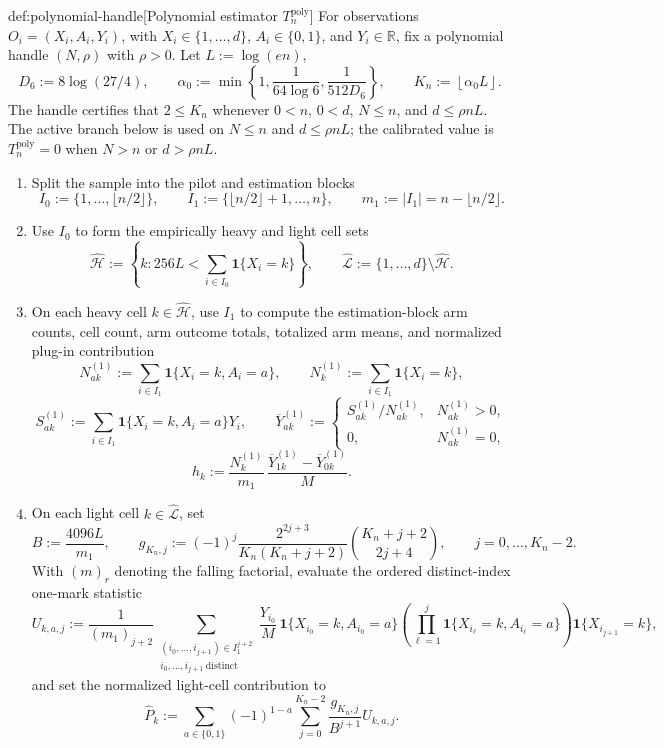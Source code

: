 \begin{algorithmv}{def:polynomial-handle}[Polynomial estimator \(T_n^{\mathrm{poly}}\)]
For observations \(O_i=(X_i,A_i,Y_i)\), with \(X_i\in\{1,\ldots,d\}\), \(A_i\in\{0,1\}\), and \(Y_i\in\mathbb R\), fix a polynomial handle \((N,\rho)\) with \(\rho>0\).  Let \(L:=\log(en)\),
\[
D_6:=8\log(27/4),
\qquad
\alpha_0:=\min\left\{1,\frac{1}{64\log 6},\frac{1}{512D_6}\right\},
\qquad
K_n:=\left\lfloor \alpha_0 L\right\rfloor .
\]
The handle certifies that \(2\le K_n\) whenever \(0<n\), \(0<d\), \(N\le n\), and \(d\le \rho nL\).  The active branch below is used on \(N\le n\) and \(d\le \rho nL\); the calibrated value is \(T_n^{\mathrm{poly}}=0\) when \(N>n\) or \(d>\rho nL\).

\begin{enumerate}
\item Split the sample into the pilot and estimation blocks
\[
I_0:=\{1,\ldots,\lfloor n/2\rfloor\},
\qquad
I_1:=\{\lfloor n/2\rfloor+1,\ldots,n\},
\qquad
m_1:=|I_1|=n-\lfloor n/2\rfloor .
\]

\item Use \(I_0\) to form the empirically heavy and light cell sets
\[
\widehat{\mathcal H}
:=
\left\{k:256L<\sum_{i\in I_0}\mathbf 1\{X_i=k\}\right\},
\qquad
\widehat{\mathcal L}
:=
\{1,\ldots,d\}\setminus \widehat{\mathcal H}.
\]

\item On each heavy cell \(k\in\widehat{\mathcal H}\), use \(I_1\) to compute the estimation-block arm counts, cell count, arm outcome totals, totalized arm means, and normalized plug-in contribution
\[
N_{ak}^{(1)}
:=
\sum_{i\in I_1}\mathbf 1\{X_i=k,A_i=a\},
\qquad
N_k^{(1)}
:=
\sum_{i\in I_1}\mathbf 1\{X_i=k\},
\]
\[
S_{ak}^{(1)}
:=
\sum_{i\in I_1}\mathbf 1\{X_i=k,A_i=a\}Y_i,
\qquad
\overline Y_{ak}^{(1)}
:=
\begin{cases}
S_{ak}^{(1)}/N_{ak}^{(1)}, & N_{ak}^{(1)}>0,\\
0, & N_{ak}^{(1)}=0,
\end{cases}
\]
\[
\widehat h_k
:=
\frac{N_k^{(1)}}{m_1}\,
\frac{\overline Y_{1k}^{(1)}-\overline Y_{0k}^{(1)}}{M}.
\]

\item On each light cell \(k\in\widehat{\mathcal L}\), set
\[
B:=\frac{4096L}{m_1},
\qquad
g_{K_n,j}:=
(-1)^j\frac{2^{2j+3}}{K_n(K_n+j+2)}{K_n+j+2\choose 2j+4},
\qquad
j=0,\ldots,K_n-2.
\]
With \((m)_r\) denoting the falling factorial, evaluate the ordered distinct-index one-mark statistic
\[
U_{k,a,j}
:=
\frac{1}{(m_1)_{j+2}}
\sum_{\substack{(i_0,\ldots,i_{j+1})\in I_1^{j+2}\\
i_0,\ldots,i_{j+1}\ \mathrm{distinct}}}
\frac{Y_{i_0}}{M}\,
\mathbf 1\{X_{i_0}=k,A_{i_0}=a\}
\left(\prod_{\ell=1}^{j}\mathbf 1\{X_{i_\ell}=k,A_{i_\ell}=a\}\right)
\mathbf 1\{X_{i_{j+1}}=k\},
\]
and set the normalized light-cell contribution to
\[
\widehat P_k
:=
\sum_{a\in\{0,1\}}(-1)^{1-a}
\sum_{j=0}^{K_n-2}\frac{g_{K_n,j}}{B^{j+1}}U_{k,a,j}.
\]


\end{enumerate}
\end{algorithmv}
